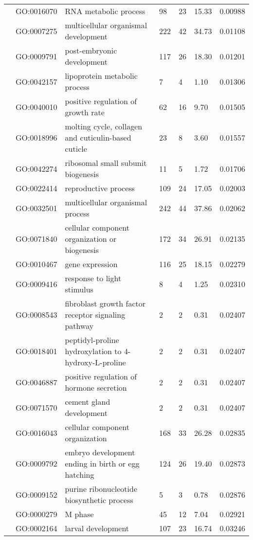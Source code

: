 \documentclass[10pt]{bmc_article}
\newenvironment{bmcformat}{\begin{raggedright}\baselineskip20pt\sloppy\setboolean{publ}{false}}{\end{raggedright}\baselineskip20pt\sloppy}
\begin{document}
\begin{bmcformat}
\begin{longtable}{p{1.7cm}lp{4.5cm}p{1cm}p{1cm}ll}
   & GO:0016070 & RNA metabolic process &  98 &  23 & 15.33 & 0.00988 \\ 
   & GO:0007275 & multicellular organismal development & 222 &  42 & 34.73 & 0.01108 \\ 
   & GO:0009791 & post-embryonic development & 117 &  26 & 18.30 & 0.01201 \\ 
   & GO:0042157 & lipoprotein metabolic process &   7 &   4 & 1.10 & 0.01306 \\ 
   & GO:0040010 & positive regulation of growth rate &  62 &  16 & 9.70 & 0.01505 \\ 
   & GO:0018996 & molting cycle, collagen and cuticulin-based cuticle &  23 &   8 & 3.60 & 0.01557 \\ 
   & GO:0042274 & ribosomal small subunit biogenesis &  11 &   5 & 1.72 & 0.01706 \\ 
   & GO:0022414 & reproductive process & 109 &  24 & 17.05 & 0.02003 \\ 
   & GO:0032501 & multicellular organismal process & 242 &  44 & 37.86 & 0.02062 \\ 
   & GO:0071840 & cellular component organization or biogenesis & 172 &  34 & 26.91 & 0.02135 \\ 
   & GO:0010467 & gene expression & 116 &  25 & 18.15 & 0.02279 \\ 
   & GO:0009416 & response to light stimulus &   8 &   4 & 1.25 & 0.02310 \\ 
   & GO:0008543 & fibroblast growth factor receptor signaling pathway &   2 &   2 & 0.31 & 0.02407 \\ 
   & GO:0018401 & peptidyl-proline hydroxylation to 4-hydroxy-L-proline &   2 &   2 & 0.31 & 0.02407 \\ 
   & GO:0046887 & positive regulation of hormone secretion &   2 &   2 & 0.31 & 0.02407 \\ 
   & GO:0071570 & cement gland development &   2 &   2 & 0.31 & 0.02407 \\ 
   & GO:0016043 & cellular component organization & 168 &  33 & 26.28 & 0.02835 \\ 
   & GO:0009792 & embryo development ending in birth or egg hatching & 124 &  26 & 19.40 & 0.02873 \\ 
   & GO:0009152 & purine ribonucleotide biosynthetic process &   5 &   3 & 0.78 & 0.02876 \\ 
   & GO:0000279 & M phase &  45 &  12 & 7.04 & 0.02921 \\ 
   & GO:0002164 & larval development & 107 &  23 & 16.74 & 0.03246 \\ 

\end{longtable}
\end{bmcformat}
\end{document}
